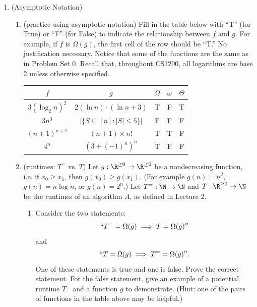 \documentclass[11pt]{article}
\begin{document}
\begin{enumerate}
    \item (Asymptotic Notation)
    \begin{enumerate}
    \item (practice using asymptotic notation)
        Fill in the table below with ``T'' (for True) or ``F'' (for False) to indicate the relationship between $f$ and $g$. For example, if $f$ is $\Omega(g)$, the first cell of the row should be ``T.''   No justification necessary.  Notice that some of the functions are the same as in Problem Set 0. Recall that, throughout CS1200, all logarithms are base 2 unless otherwise specified.

        \begin{table}[h!]
        \centering
        \bgroup
        \def\arraystretch{1.3}
        \begin{tabular}{||c | c || c | c | c ||}
         \hline
         $f$ & $g$ & $\Omega$ & $\omega$ & $\Theta$ \\
         \hline\hline
         $3(\log_2 n)^{2}$ & $2(\ln n) \cdot (\ln n + 3)$ & T & F & T \\ \hline
         $3n^3$ & $|\{ S \subseteq [n] : |S| \leq 5 \}|$ & F & F & F \\ \hline
         $(n+1)^{n+1}$ & $(n+1) \times n!$ & T & T & F \\ \hline
         $4^n$ & $\left(3+(-1)^n\right)^n$ & T & F& F \\ \hline
        \end{tabular}
        \egroup
        \end{table}

    \item  (runtimes: $T^=$ vs. $T$)
    Let $g : \R^{\geq 0}\rightarrow \R^{\geq 0}$ be a nondecreasing function, i.e. if $x_0\geq x_1$, then $g(x_0)\geq g(x_1)$. (For example $g(n)=n^2$, $g(n)=n\log n$, or $g(n)=2^n$.) Let $T^{=} : \N\rightarrow \N$ and $T : \R^{\geq 0}\rightarrow \N$ be the runtimes of an algorithm $A$, as defined in Lecture 2.
    \begin{enumerate}
    \item Consider the two statements:
    $$``T^{=} = \Omega(g) \implies T = \Omega(g)''$$
    and
    $$``T = \Omega(g) \implies T^{=} = \Omega(g)''.$$
    One of these statements is true and one is false. Prove the correct statement. For the false statement, give an example of a potential runtime $T^{=}$ and a function $g$ to demonstrate.  (Hint: one of the pairs of functions in the table above may be helpful.)


\end{enumerate}
\end{enumerate}
\end{enumerate}
\end{document}
